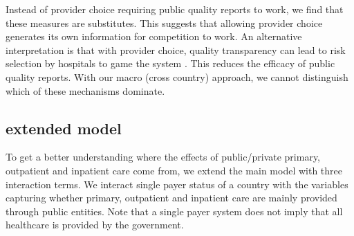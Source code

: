 \documentclass{article}
\begin{document}
Instead of provider choice requiring public quality reports to work, we find that these measures are substitutes. This suggests that allowing provider choice generates its own information for competition to work. An alternative interpretation is that with provider choice, quality transparency can lead to risk selection by hospitals to game the system \citep{dranoveReportCards2003}. This reduces the efficacy of public quality reports. With our macro (cross country) approach, we cannot distinguish which of these mechanisms dominate.

\subsection{extended model}
\label{sec:orga680039}

To get a better understanding where the effects of public/private primary, outpatient and inpatient care come from, we extend the main model with three interaction terms. We interact single payer status of a country with the variables capturing whether primary, outpatient and inpatient care are mainly provided through public entities. Note that a single payer system does not imply that all healthcare is provided by the government.
\end{document}

